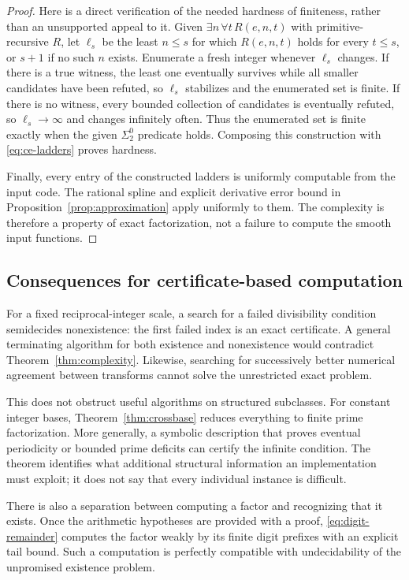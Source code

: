 \documentclass[11pt,a4paper]{article}
\theoremstyle{definition}
\theoremstyle{remark}
\begin{document}
\begin{proof}
Here is a direct verification of the needed hardness of finiteness, rather
than an unsupported appeal to it. Given
$\exists n\,\forall t\,R(e,n,t)$ with primitive-recursive $R$, let
$\ell_s$ be the least $n\le s$ for which $R(e,n,t)$ holds for every
$t\le s$, or $s+1$ if no such $n$ exists. Enumerate a fresh integer whenever
$\ell_s$ changes. If there is a true witness, the least one eventually
survives while all smaller candidates have been refuted, so $\ell_s$
stabilizes and the enumerated set is finite. If there is no witness, every
bounded collection of candidates is eventually refuted, so
$\ell_s\to\infty$ and changes infinitely often. Thus the enumerated set
is finite exactly when the given $\Sigma^0_2$ predicate holds. Composing
this construction with \eqref{eq:ce-ladders} proves hardness.

Finally, every entry of the constructed ladders is uniformly computable
from the input code. The rational spline and explicit derivative error
bound in Proposition~\ref{prop:approximation} apply uniformly to them.
The complexity is therefore a property of exact factorization, not a
failure to compute the smooth input functions.
\end{proof}

\subsection{Consequences for certificate-based computation}
For a fixed reciprocal-integer scale, a search for a failed divisibility
condition semidecides nonexistence: the first failed index is an exact
certificate. A general terminating algorithm for both existence and
nonexistence would contradict Theorem~\ref{thm:complexity}. Likewise,
searching for successively better numerical agreement between transforms
cannot solve the unrestricted exact problem.

This does not obstruct useful algorithms on structured subclasses. For
constant integer bases, Theorem~\ref{thm:crossbase} reduces everything to
finite prime factorization. More generally, a symbolic description that
proves eventual periodicity or bounded prime deficits can certify the
infinite condition. The theorem identifies what additional structural
information an implementation must exploit; it does not say that every
individual instance is difficult.

There is also a separation between computing a factor and recognizing
that it exists. Once the arithmetic hypotheses are provided with a proof,
\eqref{eq:digit-remainder} computes the factor weakly by its finite digit
prefixes with an explicit tail bound. Such a computation is perfectly
compatible with undecidability of the unpromised existence problem.
\end{document}
